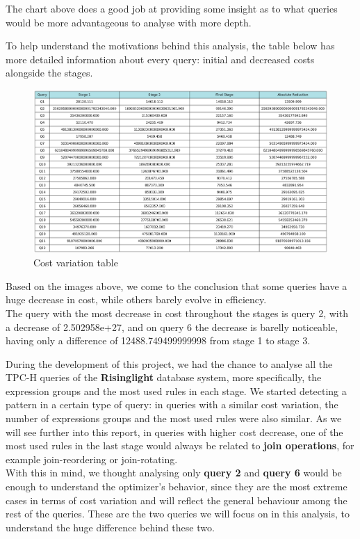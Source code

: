 \documentclass[a4paper,12pt]{scrreprt}
\begin{document}
The chart above does a good job at providing some insight as to what queries would be more advantageous to analyse with more depth. 

To help understand the motivations behind this analysis, the table below has more detailed information about every query: initial and decreased costs alongside the stages.

\begin{figure}[H]
    \includegraphics[width = 1.45\textwidth, height = 0.40\textheight, keepaspectratio]{img_cost_differential/cost_reduction_table.png}
    \caption{Cost variation table}
    \label{fig:tab1}
\end{figure}

Based on the images above, we come to the conclusion that some queries have a huge decrease in cost, while others barely evolve in efficiency. \\
The query with the most decrease in cost throughout the stages is query 2, with a decrease of 2.502958e+27, and on query 6 the decrease is barelly noticeable, having only a difference of 12488.749499999998 from stage 1 to stage 3. 

During the development of this project, we had the chance to analyse all the TPC-H queries of the \textbf{Risinglight} database system, more specifically, the expression groups and the most used rules in each stage. We started detecting a pattern in a certain type of query: in queries with a similar cost variation, the number of expressions groups and the most used rules were also similar. As we will see further into this report, in queries with higher cost decrease, one of the most used rules in the last stage would always be related to \textbf{join operations}, for example join-reordering or join-rotating. \\
With this in mind, we thought analysing only \textbf{query 2} and \textbf{query 6} would be enough to understand the optimizer's behavior, since they are the most extreme cases in terms of cost variation and will reflect the general behaviour among the rest of the queries.
These are the two queries we will focus on in this analysis, to understand the huge difference behind these two.
\end{document}
